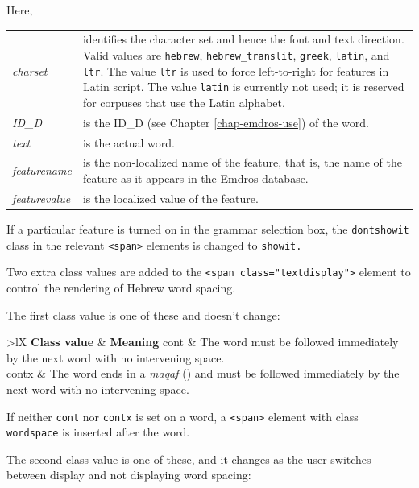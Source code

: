 \documentclass[11pt,oneside,a4paper]{memoir}
\makeatletter
\newcommand{\heb}[1]{{\RL {\ezr #1}}}
\newcommand*{\xml}[1]{\texttt{<#1>}}
\newcommand*{\xmla}[1]{\texttt{#1}} %
\newcommand{\headii}[2]{\textbf{#1} & \textbf{#2}}
\newenvironment{my-tabu}[2]{%
\begin{center}
\begin{tabu}{@{}#1@{}}
  \toprule
  #2\\\addlinespace[-1mm]
  \midrule
}{%
\addlinespace[-1mm]\bottomrule
\end{tabu}
\end{center}%
}
\makeatother
\begin{document}
\begin{minipage}{\textwidth}
Here,

\begin{tabu}{>{\itshape}lX}
charset & identifies the character set and hence the font and text direction. Valid values are
\xmla{hebrew}, \xmla{hebrew\_translit}, \xmla{greek}, \xmla{latin}, and \xmla{ltr}. The value
\xmla{ltr} is used to force left-to-right for features in Latin script. The value \xmla{latin} is
currently not used; it is reserved for corpuses that use the Latin alphabet.\\

ID\_D & is the ID\_D (see Chapter \ref{chap-emdros-use}) of the word.\\

text & is the actual word.\\

featurename & is the non-localized name of the feature, that is, the name of the feature as it
appears in the Emdros database.\\

featurevalue & is the localized value of the feature.\\
\end{tabu}
\end{minipage}

If a particular feature is turned on in the grammar selection box, the \xmla{dontshowit} class in the
relevant \xml{span} elements is changed to \xmla{showit.}

Two extra class values are added to the \xml{span class="textdisplay"} element to control the
rendering of Hebrew word spacing. 

The first class value is one of these and doesn't change:

\begin{my-tabu}{>{\ttfamily}lX}{ \headii{\textrm{Class value}}{Meaning} }
  cont & The word must be followed immediately by the next word with no intervening space.\\

  contx & The word ends in a \emph{maqaf} (\heb{־}) and must be followed immediately by the next word
  with no intervening space.\\
\end{my-tabu}

If neither \xmla{cont} nor \xmla{contx} is set on a word, a \xml{span} element with class
\xmla{wordspace} is inserted after the word.


The second class value is one of these, and it changes as the user switches between display and not
displaying word spacing:
\end{document}
